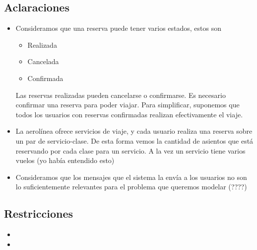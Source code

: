 \subsection{Aclaraciones}
  \begin{itemize}
    \item Consideramos que una reserva puede tener varios estados, estos son
          \begin{itemize}
            \item   Realizada
            \item   Cancelada
            \item   Confirmada
          \end{itemize}

          Las reservas realizadas pueden cancelarse o confirmarse.
          Es necesario confirmar una reserva para poder viajar.
          Para simplificar, suponemos que todos los usuarios con reservas
          confirmadas realizan efectivamente el viaje.
    
    \item La aerolínea ofrece servicios de viaje, y cada usuario realiza una
          reserva sobre un par de servicio-clase.
          De esta forma vemos la cantidad de asientos que está reservando por
          cada clase para un servicio.
          A la vez un servicio tiene varios vuelos (yo había entendido esto)

    \item Consideramos que los mensajes que el sistema la envía a los usuarios
          no son lo suficientemente relevantes para el problema que queremos
          modelar (????)
            
  \end{itemize}

\subsection{Restricciones}
  \begin{itemize}
    \item
    
    \item    
  \end{itemize}


